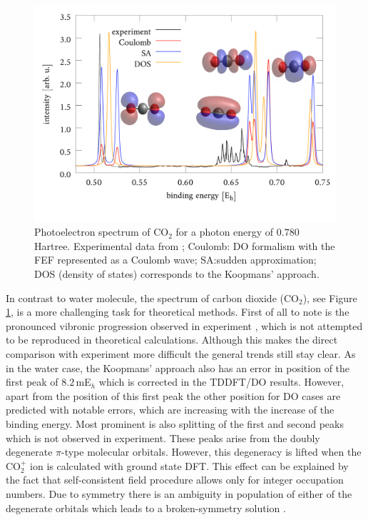 \begin{figure}
   \includegraphics[width=\textwidth]{Figures/CO2/CO2_spect}
   \caption{Photoelectron spectrum of CO$_2$ for a photon energy of $0.780\,$Hartree.
   Experimental data from \cite{DiffLinear}; Coulomb: DO formalism with the FEF represented as a Coulomb wave;
   SA:sudden approximation; DOS (density of states) corresponds to the Koopmans' approach.}
   \label{fig:CO2PES}
\end{figure}
In contrast to water molecule, the spectrum of carbon dioxide (CO$_2$), see Figure \ref{fig:CO2PES}, is a more challenging task for theoretical methods.
First of all to note is the pronounced vibronic progression observed in experiment \cite{DiffLinear}, which is not attempted to be reproduced in theoretical calculations.
Although this makes the direct comparison with experiment more difficult the general trends still stay clear.
As in the water case, the Koopmans' approach also has an error in position of the first peak of $8.2$\,mE$_h$ which is corrected in the TDDFT/DO results.
However, apart from the position of this first peak the other position for DO cases are predicted with notable errors, which are increasing with the increase of the binding energy.
Most prominent is also splitting of the first and second peaks which is not observed in experiment.
These peaks arise from the doubly degenerate $\pi$-type molecular orbitals.
However, this degeneracy is lifted when the CO$_2^+$ ion is calculated with ground state DFT.
This effect can be explained by the fact that self-consistent field procedure allows only for integer occupation numbers.
Due to symmetry there is an ambiguity in population of either of the degenerate orbitals which leads to a broken-symmetry solution \cite{Holthausen}.
